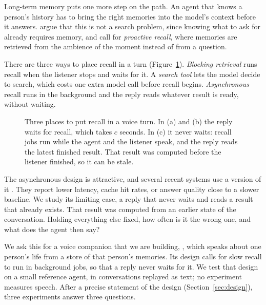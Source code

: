 \documentclass[10pt]{article}
\begin{document}
Long-term memory puts one more step on the path. An agent that knows a person's history has to bring the right memories into the model's context before it answers. \citet{xiao2026memory} argue that this is not a search problem, since knowing what to ask for already requires memory, and call for \emph{proactive recall}, where memories are retrieved from the ambience of the moment instead of from a question.

There are three ways to place recall in a turn (Figure~\ref{fig:timeline}). \emph{Blocking retrieval} runs recall when the listener stops and waits for it. A \emph{search tool} lets the model decide to search, which costs one extra model call before recall begins. \emph{Asynchronous} recall runs in the background and the reply reads whatever result is ready, without waiting.

\begin{figure}[t]
\centering
\timelinefigure
\caption{Three places to put recall in a voice turn. In (a) and (b) the reply waits for recall, which takes $c$ seconds. In (c) it never waits: recall jobs run while the agent and the listener speak, and the reply reads the latest finished result. That result was computed before the listener finished, so it can be stale.}
\label{fig:timeline}
\end{figure}

The asynchronous design is attractive, and several recent systems use a version of it \citep{christakopoulou2024talker,qiu2026voiceagentrag,gan2025pmfr,chien2026moshirag,arora2025streamrag}. They report lower latency, cache hit rates, or answer quality close to a slower baseline. We study its limiting case, a reply that never waits and reads a result that already exists. That result was computed from an earlier state of the conversation. Holding everything else fixed, how often is it the wrong one, and what does the agent then say?

We ask this for a voice companion that we are building\ifanon\else, \product{}\fi, which speaks about one person's life from a store of that person's memories. Its design calls for slow recall to run in background jobs, so that a reply never waits for it. We test that design on a small reference agent, in conversations replayed as text; no experiment measures speech. After a precise statement of the design (Section~\ref{sec:design}), three experiments answer three questions.
\end{document}
